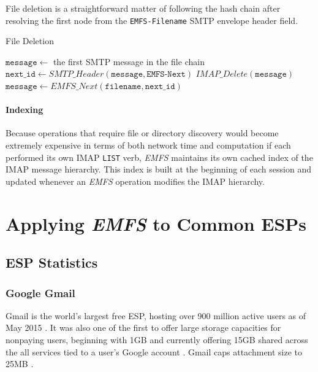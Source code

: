\documentclass[12pt]{article}
\begin{document}
File deletion is a straightforward matter of following the hash chain after
resolving the first node from the \texttt{EMFS-Filename} SMTP envelope header
field.

\begin{algorithm}
\caption{File Deletion}
\begin{algorithmic}[1]
\State $\mathtt{message} \gets $ the first SMTP message in the file chain
\Do
\State $\mathtt{next\_id} \gets \mathit{SMTP\_Header}(\mathtt{message}, \texttt{EMFS-Next})$
\State $\mathit{IMAP\_Delete}(\mathtt{message})$
\State $\mathtt{message} \gets \mathit{EMFS\_Next}(\mathtt{filename}, \mathtt{next\_id})$
\EndProcedure
\end{algorithmic}
\end{algorithm}

\paragraph{Indexing}

Because operations that require file or directory discovery would become
extremely expensive in terms of both network time and computation if each
performed its own IMAP \texttt{LIST} verb, \textit{EMFS} maintains its own
cached index of the IMAP message hierarchy. This index is built at the beginning
of each session and updated whenever an \textit{EMFS} operation modifies the
IMAP hierarchy.

\section{Applying \textit{EMFS} to Common ESPs}

\subsection{ESP Statistics}

\subsubsection{Google Gmail}

Gmail is the world's largest free ESP, hosting over 900 million active users
as of May 2015 \cite{gmail:01}. It was also one of the first to offer large
storage capacities for nonpaying users, beginning with 1GB and currently
offering 15GB shared across the all services tied to a user's Google account
\cite{kuchinskas, gmail:02}. Gmail caps attachment size to 25MB
\cite{google:01}.
\end{document}

